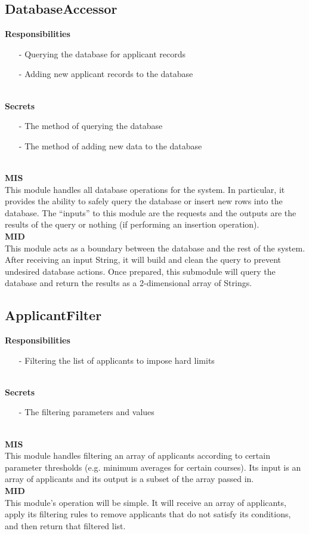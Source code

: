 \documentclass[titlepage]{article}
\begin{document}
\subsection{DatabaseAccessor}
\textbf{Responsibilities}
\begin{itemize}
	\item[-] Querying the database for applicant records
	\item[-] Adding new applicant records to the database
\end{itemize}~\\
\textbf{Secrets}
\begin{itemize}
	\item[-] The method of querying the database
	\item[-] The method of adding new data to the database
\end{itemize}~\\
\newpage
\noindent\textbf{MIS}\\[2mm]
This module handles all database operations for the system. In particular, it provides the ability to safely query the database or insert new rows into the database. The ``inputs'' to this module are the requests and the outputs are the results of the query or nothing (if performing an insertion operation).\\[6mm]
\textbf{MID}\\[2mm]
This module acts as a boundary between the database and the rest of the system. After receiving an input String, it will build and clean the query to prevent undesired database actions. Once prepared, this submodule will query the database and return the results as a 2-dimensional array of Strings.\\[6mm]

\subsection{ApplicantFilter}
\textbf{Responsibilities}
\begin{itemize}
	\item[-] Filtering the list of applicants to impose hard limits
\end{itemize}~\\
\textbf{Secrets}
\begin{itemize}
	\item[-] The filtering parameters and values
\end{itemize}~\\
\textbf{MIS}\\[2mm]
This module handles filtering an array of applicants according to certain parameter thresholds (e.g. minimum averages for certain courses). Its input is an array of applicants and its output is a subset of the array passed in.\\[6mm]
\textbf{MID}\\[2mm]
This module's operation will be simple. It will receive an array of applicants, apply its filtering rules to remove applicants that do not satisfy its conditions, and then return that filtered list.\\[6mm]
\end{document}
